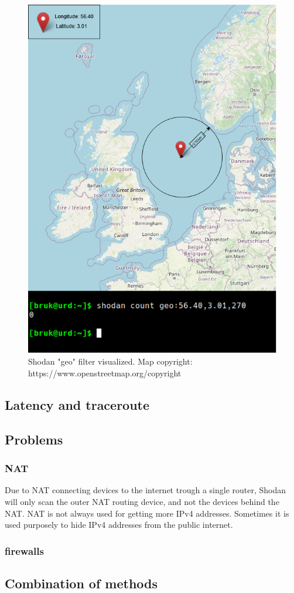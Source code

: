 \begin{figure} [H]
    \centering
    \includegraphics[scale=0.7]{Figurer/geolocation.png}
    \caption{Shodan "geo" filter visualized. Map copyright: https://www.openstreetmap.org/copyright}
    \label{fig:geolocation}
\end{figure}

\subsection{Latency and traceroute}
\subsection{Problems}
\subsubsection{NAT}
Due to NAT connecting devices to the internet trough a single router, Shodan will only scan the outer NAT routing device, and not the devices behind the NAT. NAT is not always used for getting more IPv4 addresses. Sometimes it is used purposely to hide IPv4 addresses from the public internet.

\subsubsection{firewalls}

\subsection{Combination of methods} \label{sec:combo}
